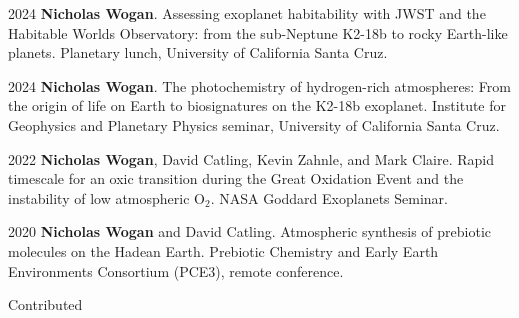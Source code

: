\documentclass{article}
\begin{document}
\begin{cvlist}
\item[2024]
  \textbf{Nicholas Wogan}. Assessing exoplanet habitability with JWST and the Habitable Worlds Observatory: from the sub-Neptune K2-18b to rocky Earth-like planets. Planetary lunch, University of California Santa Cruz.
\item[2024]
  \textbf{Nicholas Wogan}. The photochemistry of hydrogen-rich atmospheres: From the origin of life on Earth to biosignatures on the K2-18b exoplanet. Institute for Geophysics and Planetary Physics seminar, University of California Santa Cruz.
\item[2022]
  \textbf{Nicholas Wogan}, David Catling, Kevin Zahnle, and Mark Claire. Rapid timescale for an oxic transition during the Great Oxidation Event and the instability of low atmospheric O$_2$. NASA Goddard Exoplanets Seminar.
\item[2020] 
  \textbf{Nicholas Wogan} and David Catling. Atmospheric synthesis of prebiotic molecules on the Hadean Earth. Prebiotic Chemistry and Early Earth Environments Consortium (PCE3), remote conference.
\end{cvlist}

\noindent Contributed
\end{document}
